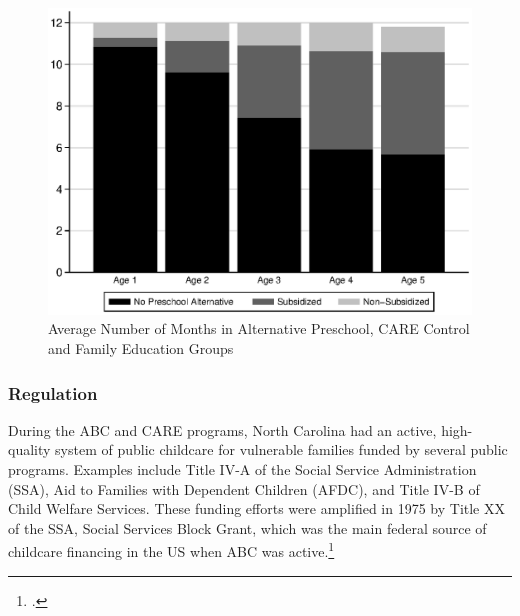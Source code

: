 \begin{appendices}
\begin{center}
	\begin{figure}[H]
		\caption{Average Number of Months in Alternative Preschool, CARE Control and Family Education Groups} \label{fig:cccare}
		\centering
		\includegraphics[width=.9\columnwidth]{output/blackwhite_CCnumber_care.eps}
	\end{figure}
\end{center}


\subsubsection{Regulation}

\noindent During the ABC and CARE programs, North Carolina had an active, high-quality system of public childcare for vulnerable families funded by several public programs. Examples include Title IV-A of the Social Service Administration (SSA), Aid to Families with Dependent Children (AFDC), and Title IV-B of Child Welfare Services. These funding efforts were amplified in 1975 by Title XX of the SSA, Social Services Block Grant, which was the main federal source of childcare financing in the US when ABC was active.\footnote{\citet{Robins_1988_Federal-Child-Care}.}\\


\end{appendices}
